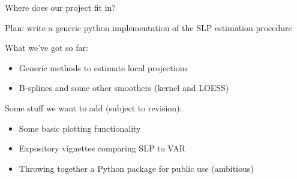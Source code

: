 \documentclass{beamer}
\begin{document}
\begin{frame}{Where does our project fit in?}

    Plan: write a generic python implementation of the SLP estimation procedure

    What we've got so far:

    \begin{itemize}
        \item Generic methods to estimate local projections
        \item B-splines and some other smoothers (kernel and LOESS)
    \end{itemize}

    Some stuff we want to add (subject to revision):

    \begin{itemize}
        \item Some basic plotting functionality
        \item Expository vignettes comparing SLP to VAR
        \item Throwing together a Python package for public use (ambitious)    
    \end{itemize}

\end{frame}
\end{document}
